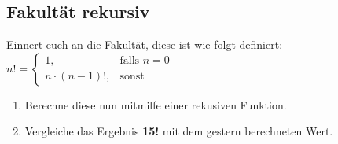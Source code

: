 \subsection{Fakultät rekursiv }
Einnert euch an die Fakultät, diese ist wie folgt definiert:
$n! =\left\{\begin{array}{cl} 1, & \mbox{falls }  n = 0 \\ n \cdot(n-1)!, & \mbox{sonst} \end{array}\right.$
\begin{enumerate}
    \item Berechne diese nun mitmilfe einer rekusiven Funktion.
    \item Vergleiche das Ergebnis \textbf{15!} mit dem gestern berechneten Wert.
\end{enumerate}
